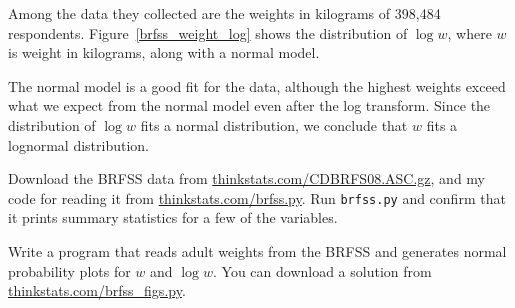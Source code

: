 \documentclass[12pt]{book}
\begin{document}
Among the data they collected are the weights in kilograms of
398,484 respondents.
Figure~\ref{brfss_weight_log} shows the distribution
of $\log w$, where $w$ is weight in kilograms, along with a normal
model.


The normal model is a good fit for the data, although the highest
weights exceed what we expect from the normal model even after the log
transform.  Since the distribution of $\log w$ fits a normal distribution, we
conclude that $w$ fits a lognormal distribution.







\begin{exercise}
Download the BRFSS data from 
\url{thinkstats.com/CDBRFS08.ASC.gz}, and my code for reading it
from
\url{thinkstats.com/brfss.py}.  Run {\tt brfss.py} and confirm that
it prints summary statistics for a few of the variables.




Write a program that reads adult weights from the BRFSS and
generates normal probability plots for $w$ and $\log w$.  You can
download a solution from \url{thinkstats.com/brfss_figs.py}.

\end{exercise}
\end{document}
